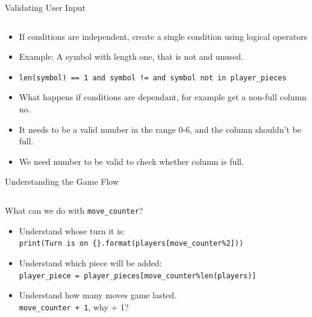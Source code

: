         \begin{frame}{Validating User Input}
            \vspace{-2mm}
            \inputminted[frame=single,framesep=2pt]{python3}{code-examples/valid_input.py}
            \begin{itemize}
                \item If conditions are independent, create a single condition using logical operators
                \item Example: A symbol with length one, that is not \textquotesingle * \textquotesingle  and unused.
                \item \texttt{len(symbol) == 1 and symbol != \textquotesingle *\textquotesingle and symbol not in player\_pieces}
                \item What happens if conditions are dependant, for example get a non-full column no.
                \item It needs to be a valid number in the range 0-6, and the column shouldn't be full.
                \item We need number to be valid to check whether column is full.
            \end{itemize}
        \end{frame}

        \begin{frame}{Understanding the Game Flow}
            \LARGE
            \inputminted[frame=single,framesep=2pt,firstline=35,lastline=35]{python3}{code-examples/connect_four.py}
            What can we do with \texttt{move\_counter}?
            \begin{itemize}
                \item Understand whose turn it is:\\
                \texttt{print(\textquotesingle Turn is on \{\}\textquotesingle.format(players[move\_counter\%2]))}
                \item Understand which piece will be added:\\
                \texttt{player\_piece = player\_pieces[move\_counter\%len(players)]                }
                \item Understand how many moves game lasted.\\
                \texttt{move\_counter + 1}, why + 1?
            \end{itemize}
        \end{frame}

